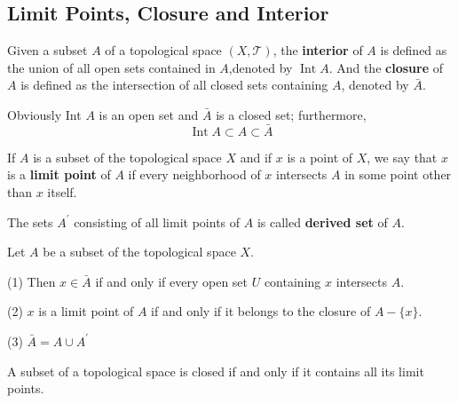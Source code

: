\documentclass[12pt, a4paper, oneside]{book}
\begin{document}
\subsection{Limit Points, Closure and Interior}


\begin{definition}
    Given a subset $A$ of a topological space $\left(X,\mathscr{T}\right)$, the \textbf{interior} of $A$ is defined as the union of all open sets contained in $A$,denoted by $\operatorname{Int} A$.
    And the \textbf{closure} of $A$ is defined as the intersection of all closed sets containing $A$, denoted by $\bar{A}$.

    Obviously Int $A$ is an open set and $\bar{A}$ is a closed set; furthermore,
    \begin{equation*}
        \operatorname{Int} A \subset A \subset \bar{A}
    \end{equation*}
\end{definition}

\begin{definition}
    If $A$ is a subset of the topological space $X$ and if $x$ is a point of $X$, we say that $x$ is a \textbf{limit point} of $A$ if every neighborhood of $x$ intersects $A$ in some point other than $x$ itself.

    The sets $A^\prime$ consisting of all limit points of $A$ is called \textbf{derived set} of $A$.
\end{definition}

\begin{theorem}
    Let $A$ be a subset of the topological space $X$.

    (1) Then $x \in \bar{A}$ if and only if every open set $U$ containing $x$ intersects $A$.

    (2) $x$ is a limit point of $A$ if and only if it belongs to the closure of $A-\{x\}$.

    (3) $\bar{A}=A\cup A^\prime$
\end{theorem}

\begin{corollary}
    A subset of a topological space is closed if and only if it contains all its limit points.
\end{corollary}
\end{document}
